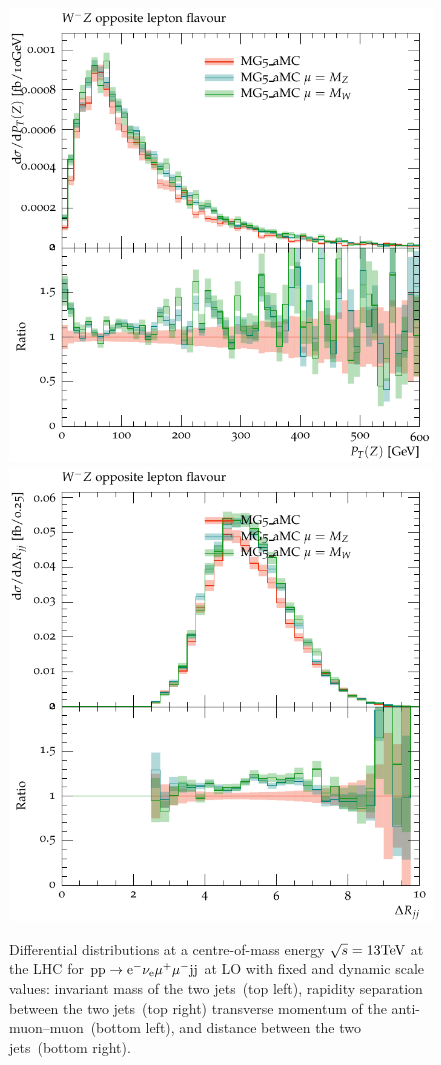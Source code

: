 \documentclass[11pt]{cernrep}
\begin{document}
\begin{figure}[htbp]
\begin{center}
   \includegraphics[scale=0.5]{figs/MG_WmZ_OF_ZPt}
   \includegraphics[scale=0.5]{figs/MG_WmZ_OF_dRjj}
\caption{Differential distributions at a centre-of-mass energy $\sqrt{s}=13{\rm TeV}$ at the LHC for ${\rm p} {\rm p}
  \to {\rm e}^-  \nu_{\rm e}  \mu^+ \mu^- {\rm j} {\rm j}$ at LO with fixed and dynamic scale values: 
                invariant mass of the two jets~(top left),
                rapidity separation between the two jets~(top right)
                transverse momentum of the anti-muon--muon~(bottom left), and
                distance between the two jets~(bottom right).}
\label{vbs_fig_shower_2a}
\end{center}
\end{figure}
\end{document}
